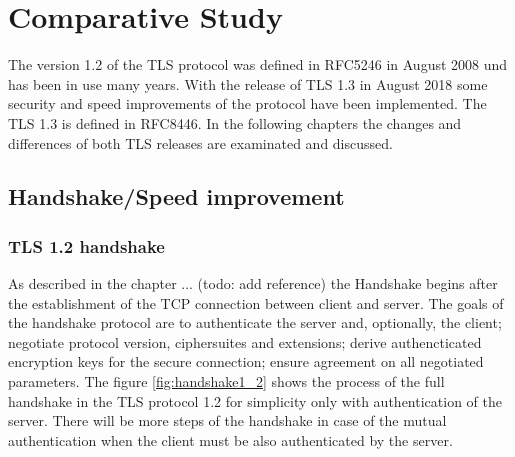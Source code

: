 \chapter{Comparative Study}
\label{chap:comparative_study}

The version 1.2 of the TLS protocol was defined in RFC5246 in August 2008 und has been in use many years. With the release of TLS 1.3 in August 2018 some security and speed improvements of the protocol have been implemented. The TLS 1.3 is defined in RFC8446. In the following chapters the changes and differences of both TLS releases are examinated and discussed.

\section{Handshake/Speed improvement}
\label{sec:comparison_handshake}

\subsection{TLS 1.2 handshake}
\label{subsec:handshake1_2}

As described in the chapter ... (todo: add reference) the Handshake begins after the establishment of the TCP connection between client and server. The goals of the handshake protocol are to authenticate the server and, optionally, the client; negotiate protocol version, ciphersuites and extensions; derive authencticated encryption keys for the secure connection; ensure agreement on all negotiated parameters. \cite{Hassenstein}
The figure \ref{fig:handshake1_2} shows the process of the full handshake in the TLS protocol 1.2 for simplicity only with authentication of the server. There will be more steps of the handshake in case of the mutual authentication when the client must be also authenticated by the server.

